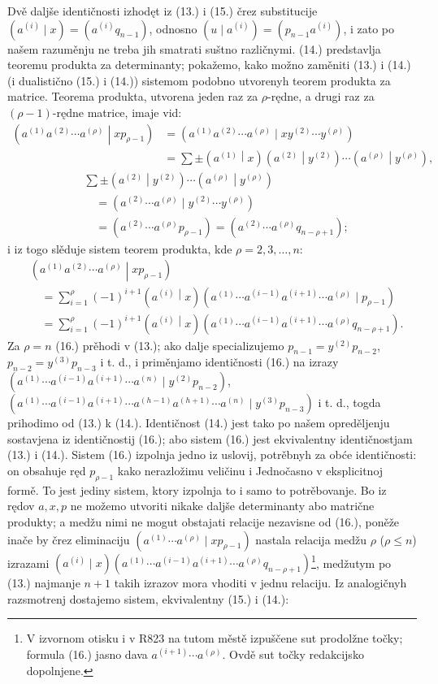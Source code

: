 \documentclass[11pt]{article}
\newcommand{\pair}[2]{\left(#1\middle|#2\right)}
\begin{document}
Dvě daljše identičnosti izhodęt iz (13.) i (15.) črez substitucije $(a^{(i)}\mid x)=(a^{(i)}q_{n-1})$, odnosno $(u\mid a^{(i)})=(p_{n-1}a^{(i)})$, i zato po našem razuměnju ne treba jih smatrati suštno različnymi. (14.) predstavlja teoremu produkta za determinanty; pokažemo, kako možno zaměniti (13.) i (14.) (i dualistično (15.) i (14.)) sistemom podobno utvorenyh teorem produkta za matrice. Teorema produkta, utvorena jeden raz za $\rho$-rędne, a drugi raz za $(\rho-1)$-rędne matrice, imaje vid:
\[
\begin{aligned}
\pair{a^{(1)}a^{(2)}\cdots a^{(\rho)}}{xp_{\rho-1}}
&=(a^{(1)}a^{(2)}\cdots a^{(\rho)}\mid xy^{(2)}\cdots y^{(\rho)})\\
&=\sum\pm\pair{a^{(1)}}{x}\pair{a^{(2)}}{y^{(2)}}\cdots\pair{a^{(\rho)}}{y^{(\rho)}},
\end{aligned}
\]
\[
\begin{aligned}
&\sum\pm\pair{a^{(2)}}{y^{(2)}}\cdots\pair{a^{(\rho)}}{y^{(\rho)}}\\
&\quad=(a^{(2)}\cdots a^{(\rho)}\mid y^{(2)}\cdots y^{(\rho)})\\
&\quad=(a^{(2)}\cdots a^{(\rho)}p_{\rho-1})
=(a^{(2)}\cdots a^{(\rho)}q_{n-\rho+1});
\end{aligned}
\]
i iz togo slěduje sistem teorem produkta, kde $\rho=2,3,\ldots,n$:
\begin{equation}
\begin{aligned}
&\pair{a^{(1)}a^{(2)}\cdots a^{(\rho)}}{xp_{\rho-1}}\\
&\quad=\sum_{i=1}^{\rho}(-1)^{i+1}\pair{a^{(i)}}{x}
(a^{(1)}\cdots a^{(i-1)}a^{(i+1)}\cdots a^{(\rho)}\mid p_{\rho-1})\\
&\quad=\sum_{i=1}^{\rho}(-1)^{i+1}\pair{a^{(i)}}{x}
(a^{(1)}\cdots a^{(i-1)}a^{(i+1)}\cdots a^{(\rho)}q_{n-\rho+1}).
\end{aligned}
\tag{16}
\end{equation}
Za $\rho=n$ (16.) prěhodi v (13.); ako dalje specializujemo $p_{n-1}=y^{(2)}p_{n-2}$, $p_{n-2}=y^{(3)}p_{n-3}$ i t. d., i priměnjamo identičnosti (16.) na izrazy $(a^{(1)}\cdots a^{(i-1)}a^{(i+1)}\cdots a^{(n)}\mid y^{(2)}p_{n-2})$, $(a^{(1)}\cdots a^{(i-1)}a^{(i+1)}\cdots a^{(h-1)}a^{(h+1)}\cdots a^{(n)}\mid y^{(3)}p_{n-3})$ i t. d., togda prihodimo od (13.) k (14.). Identičnost (14.) jest tako po našem opreděljenju sostavjena iz identičnostij (16.); abo sistem (16.) jest ekvivalentny identičnostjam (13.) i (14.). Sistem (16.) izpolnja jedno iz uslovij, potrěbnyh za obće identičnosti: on obsahuje ręd $p_{\rho-1}$ kako nerazložimu veličinu i Jednočasno v eksplicitnoj formě. To jest jediny sistem, ktory izpolnja to i samo to potrěbovanje. Bo iz rędov $a,x,p$ ne možemo utvoriti nikake daljše determinanty abo matrične produkty; a medžu nimi ne mogut obstajati relacije nezavisne od (16.), poněže inače by črez eliminaciju $(a^{(1)}\cdots a^{(\rho)}\mid xp_{\rho-1})$ nastala relacija medžu $\rho$ ($\rho\leq n$) izrazami $(a^{(i)}\mid x)(a^{(1)}\cdots a^{(i-1)}a^{(i+1)}\cdots a^{(\rho)}q_{n-\rho+1})$\footnote{V izvornom otisku i v R823 na tutom městě izpuščene sut prodolžne točky; formula (16.) jasno dava $a^{(i+1)}\cdots a^{(\rho)}$. Ovdě sut točky redakcijsko dopolnjene.}, medžutym po (13.) najmanje $n+1$ takih izrazov mora vhoditi v jednu relaciju. Iz analogičnyh razsmotrenj dostajemo sistem, ekvivalentny (15.) i (14.):
\end{document}
